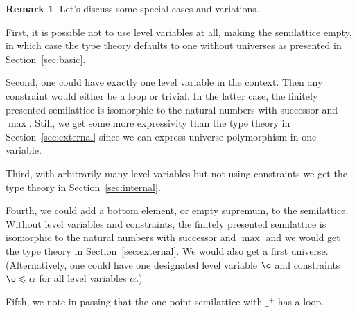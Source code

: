 \documentclass[11pt,a4paper]{article}
\theoremstyle{definition}
\newtheorem{remark}{Remark}
\newcommand{\Id}{\mathsf{Id}}
\newcommand{\UU}{\mathsf{U}}
\newcommand{\lam}[1]{{\langle}#1{\rangle}}
\begin{document}





\begin{remark}
Let's discuss some special cases and variations.

First, it is possible not to use
level variables at all, making the semilattice empty,
in which case the type theory defaults to one without universes
as presented in Section~\ref{sec:basic}.

Second, one could have exactly one level variable in the context.
Then any constraint would either be a loop or trivial.
In the latter case, the finitely presented semilattice
is isomorphic to the natural numbers with successor and $\max$.
Still, we get some more
expressivity than the type theory in Section~\ref{sec:external} since
we can express universe polymorphism in one variable.

Third, with arbitrarily many level variables but not using constraints
we get the type theory in Section~\ref{sec:internal}.

Fourth, we could add a bottom element, or empty supremum, to the semilattice.
Without level variables and constraints, the finitely presented semilattice
is isomorphic to the natural numbers with successor and $\max$
and we would get the type theory in Section~\ref{sec:external}.
We would also get a first universe.
(Alternatively, one could have one designated level variable
$\o$ and constraints $\o\leqslant\alpha$
for all level variables $\alpha$.)

Fifth, we note in passing that the one-point semilattice
with $\_^+$ has a loop.
\end{remark}
\end{document}
